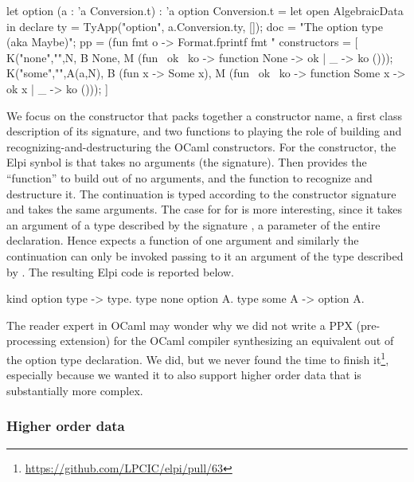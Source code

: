 \documentclass[a4paper, 11pt]{book}
\begin{document}
\begin{ocamlcode}
let option (a : 'a Conversion.t) : 'a option Conversion.t =
  let open AlgebraicData in
  declare {
    ty = TyApp("option", a.Conversion.ty, []);
    doc = "The option type (aka Maybe)";
    pp = (fun fmt o ->
      Format.fprintf fmt "%
    constructors = [
      K("none","",N,
        B None,
        M (fun ~ok ~ko -> function None -> ok | _ -> ko ())); 
      K("some","",A(a,N),
        B (fun x -> Some x),
        M (fun ~ok ~ko -> function Some x -> ok x | _ -> ko ())); 
    ]
  }
\end{ocamlcode}

\noindent
We focus on the  constructor that packs together a constructor name,
a first class description of its signature, and two functions to playing the
role of building and recognizing-and-destructuring the OCaml constructors.
For the  constructor, the Elpi synbol is 
that takes no arguments (the  signature). Then  provides
the ``function'' to build  out of no arguments, and 
the function to recognize and destructure it. The  continuation
is typed according to the constructor signature and takes the same arguments.
The case for for  is more interesting, since it takes an
argument of a type described by the signature , a parameter of
the entire declaration. Hence  expects a function of one argument
and similarly the continuation  can only be invoked passing
to it an argument of the type described by .
The resulting Elpi code is reported below.

\begin{elpicode}
kind option type -> type.
type none option A.
type some A -> option A.
\end{elpicode}

The reader expert in OCaml may wonder why we did not write a PPX (pre-processing
extension) for the OCaml compiler synthesizing an equivalent 
out of the option type declaration. We did, but we never found the time
to finish it\footnote{\url{https://github.com/LPCIC/elpi/pull/63}}, especially
because we wanted it to also support higher order data that is substantially
more complex.


\subsubsection{Higher order data}\label{sec:hodata}
\end{document}
